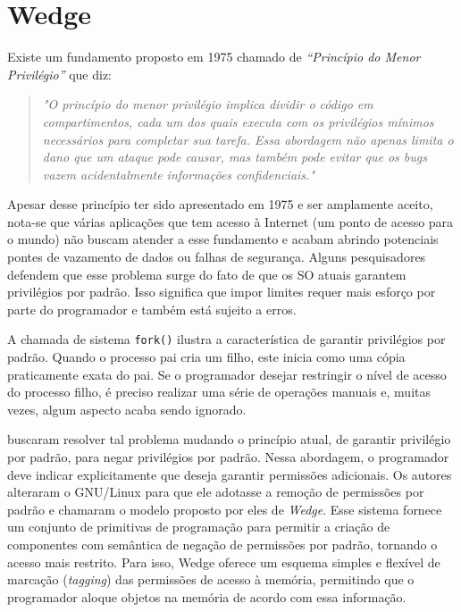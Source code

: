 \section{Wedge}

Existe um fundamento proposto em 1975 chamado de \emph{``Princípio do Menor
Privilégio''} que diz:

\begin{quote}
\emph{"O princípio do menor privilégio implica dividir o código em compartimentos,
cada um dos quais executa com os privilégios mínimos necessários para completar
sua tarefa. Essa abordagem não apenas limita o dano que um ataque pode causar,
mas também pode evitar que os bugs vazem acidentalmente informações
confidenciais."} \citep{protectionprinciple}
\end{quote}

Apesar desse princípio ter sido apresentado em 1975 e ser amplamente aceito,
nota-se que várias aplicações que tem acesso à Internet (um ponto de acesso
para o mundo) não buscam atender a esse fundamento e acabam abrindo
potenciais pontes de vazamento de dados ou falhas de segurança. Alguns
pesquisadores defendem que esse problema surge do fato de que os SO atuais
garantem privilégios por padrão. Isso significa que impor limites requer mais
esforço por parte do programador e também está sujeito a erros.

A chamada de sistema \texttt{fork()} ilustra a característica de garantir
privilégios por padrão. Quando o processo pai cria um filho, este inicia como
uma cópia praticamente exata do pai. Se o programador desejar restringir o
nível de acesso do processo filho, é preciso realizar uma série de operações
manuais e, muitas vezes, algum aspecto acaba sendo ignorado.

\citet{wedge} buscaram resolver tal problema mudando o princípio atual, de
garantir privilégio por padrão, para negar privilégios por padrão. Nessa
abordagem, o programador deve indicar explicitamente que deseja garantir
permissões adicionais. Os autores alteraram o GNU/Linux para que ele
adotasse a remoção de permissões por padrão e chamaram o modelo proposto por
eles de \emph{Wedge}. Esse sistema fornece um conjunto de primitivas de
programação para permitir a criação de componentes com semântica de negação de permissões
por padrão, tornando o acesso mais restrito. Para isso, Wedge oferece
um esquema simples e flexível de marcação (\emph{tagging}) das permissões de
acesso à memória, permitindo que o programador aloque objetos na memória de
acordo com essa informação.

